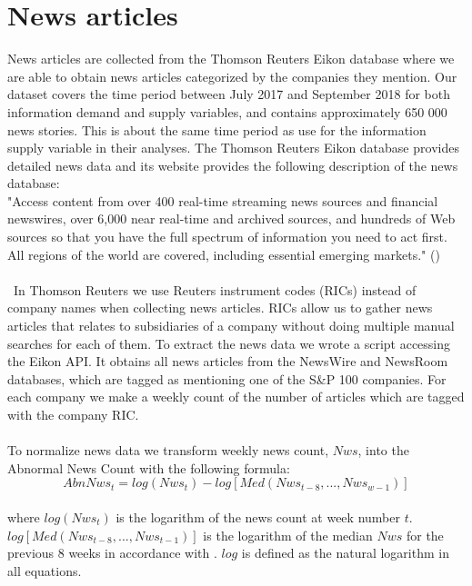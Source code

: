 \section{News articles}
News articles are collected from the Thomson Reuters Eikon database where we are able to obtain news articles categorized by the companies they mention. Our dataset covers the time period between July 2017 and September 2018 for both information demand and supply variables, and contains approximately 650 000 news stories. This is about the same time period as \cite{vlastakis} use for the information supply variable in their analyses. The Thomson Reuters Eikon database provides detailed news data and its website provides the following description of the news database:
\\
"Access content from over 400 real-time streaming news sources and financial newswires, over 6,000 near real-time and archived sources, and hundreds of Web sources so that you have the full spectrum of information you need to act first. All regions of the world are covered, including essential emerging markets." (\cite{descriptionThomsonReutersdatabase})
\\\\\
In Thomson Reuters we use Reuters instrument codes (RICs) instead of company names when collecting news articles. RICs allow us to  gather news articles that relates to subsidiaries of a company without doing multiple manual searches for each of them. To extract the news data we wrote a script accessing the Eikon API. It obtains all news articles from the NewsWire and NewsRoom databases, which are tagged as mentioning one of the S\&P 100 companies. For each company we make a weekly count of the number of articles which are tagged with the company RIC.
\\\\
To normalize news data we transform weekly news count, $Nws$, into the Abnormal News Count with the following formula:
\begin{equation}
   \label{abnormal_news} 
   AbnNws_{t} = log(Nws_{t}) - log[Med(Nws_{t-8},...,Nws_{w-1})] 
\end{equation}
\\
where $log(Nws_{t})$ is the logarithm of the news count at week number $t$. $log[Med(Nws_{t-8},...,Nws_{t-1})]$ is the logarithm of the median $Nws$ for the previous 8 weeks in accordance with \cite{engelberg}. $log$ is defined as the natural logarithm in all equations. 
\\\\

